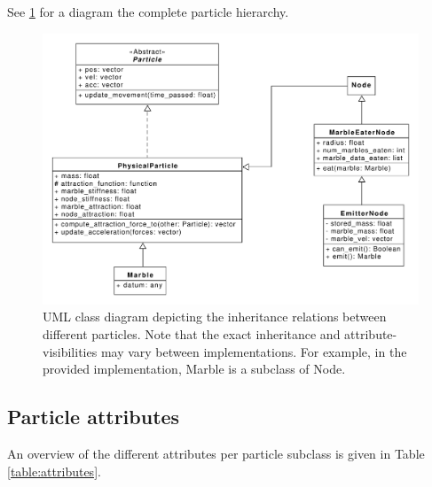 See \ref{fig:particles_class_diagram} for a diagram the complete particle hierarchy. 

\begin{figure}[h]
    \centering
    \includegraphics[scale=0.5]{figures/particles_class_diagram.pdf}
    \caption{UML class diagram depicting the inheritance relations between different particles. Note that the exact inheritance and attribute-visibilities may vary between implementations. For example, in the provided implementation, Marble is a subclass of Node.}
    \label{fig:particles_class_diagram}
\end{figure}

\subsection{Particle attributes}
An overview of the different attributes per particle subclass is given in Table \ref{table:attributes}.

